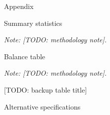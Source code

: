 \documentclass[aspectratio=169,t,11pt,table]{beamer}
\begin{document}
\appendix
\begin{frame}{Appendix}\end{frame}

\begin{frame}{Summary statistics}\label{summary-stats}
  \begin{center}
    \scalebox{.75}{\makebox[\linewidth]{}}
  \end{center}
  \parbox{0.8\textwidth}{\justifying \tiny \textit{Note: [TODO: methodology note].}}
\end{frame}

\begin{frame}{Balance table}\label{balance-table}
  \begin{center}
    \scalebox{.75}{\makebox[\linewidth]{}}
  \end{center}
  \parbox{0.8\textwidth}{\justifying \tiny \textit{Note: [TODO: methodology note].}}
\end{frame}

\begin{frame}{[TODO: backup table title]}\label{dd-table}
  \begin{center}
    \scalebox{.7}{\makebox[\linewidth]{}}
  \end{center}
\end{frame}

\begin{frame}{Alternative specifications}\label{altspecs}
  \begin{center}
    \scalebox{.7}{\makebox[\linewidth]{}}
  \end{center}
\end{frame}
\end{document}
